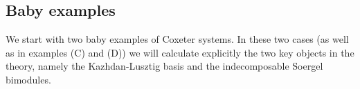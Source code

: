\documentclass[12pt]{wart}
\theoremstyle{remark}
\begin{document}


\subsection{Baby examples}  We start with two baby examples of Coxeter systems. In these two cases (as well as in examples (C) and (D)) we will  calculate explicitly the two key objects in the theory, namely  the Kazhdan-Lusztig basis and the indecomposable Soergel bimodules.   %


\newpage


 
\end{document}
